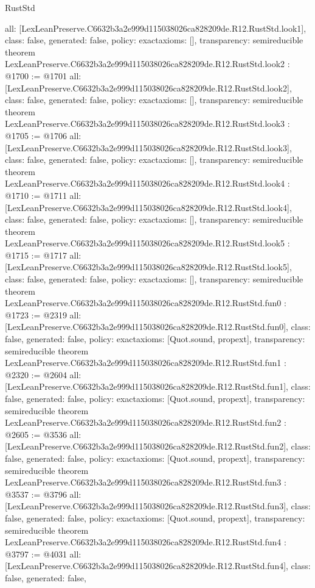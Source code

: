 \begin{lexlean}{RustStd}
\begin{coremodule}
{  all: [LexLeanPreserve.C6632b3a2e999d115038026ca828209de.R12.RustStd.look1],
  class: false,
  generated: false,
  policy: exact{axioms: []},
  transparency: semireducible
}
theorem LexLeanPreserve.C6632b3a2e999d115038026ca828209de.R12.RustStd.look2 : @1700 := @1701 {
  all: [LexLeanPreserve.C6632b3a2e999d115038026ca828209de.R12.RustStd.look2],
  class: false,
  generated: false,
  policy: exact{axioms: []},
  transparency: semireducible
}
theorem LexLeanPreserve.C6632b3a2e999d115038026ca828209de.R12.RustStd.look3 : @1705 := @1706 {
  all: [LexLeanPreserve.C6632b3a2e999d115038026ca828209de.R12.RustStd.look3],
  class: false,
  generated: false,
  policy: exact{axioms: []},
  transparency: semireducible
}
theorem LexLeanPreserve.C6632b3a2e999d115038026ca828209de.R12.RustStd.look4 : @1710 := @1711 {
  all: [LexLeanPreserve.C6632b3a2e999d115038026ca828209de.R12.RustStd.look4],
  class: false,
  generated: false,
  policy: exact{axioms: []},
  transparency: semireducible
}
theorem LexLeanPreserve.C6632b3a2e999d115038026ca828209de.R12.RustStd.look5 : @1715 := @1717 {
  all: [LexLeanPreserve.C6632b3a2e999d115038026ca828209de.R12.RustStd.look5],
  class: false,
  generated: false,
  policy: exact{axioms: []},
  transparency: semireducible
}
theorem LexLeanPreserve.C6632b3a2e999d115038026ca828209de.R12.RustStd.fun0 : @1723 := @2319 {
  all: [LexLeanPreserve.C6632b3a2e999d115038026ca828209de.R12.RustStd.fun0],
  class: false,
  generated: false,
  policy: exact{axioms: [Quot.sound, propext]},
  transparency: semireducible
}
theorem LexLeanPreserve.C6632b3a2e999d115038026ca828209de.R12.RustStd.fun1 : @2320 := @2604 {
  all: [LexLeanPreserve.C6632b3a2e999d115038026ca828209de.R12.RustStd.fun1],
  class: false,
  generated: false,
  policy: exact{axioms: [Quot.sound, propext]},
  transparency: semireducible
}
theorem LexLeanPreserve.C6632b3a2e999d115038026ca828209de.R12.RustStd.fun2 : @2605 := @3536 {
  all: [LexLeanPreserve.C6632b3a2e999d115038026ca828209de.R12.RustStd.fun2],
  class: false,
  generated: false,
  policy: exact{axioms: [Quot.sound, propext]},
  transparency: semireducible
}
theorem LexLeanPreserve.C6632b3a2e999d115038026ca828209de.R12.RustStd.fun3 : @3537 := @3796 {
  all: [LexLeanPreserve.C6632b3a2e999d115038026ca828209de.R12.RustStd.fun3],
  class: false,
  generated: false,
  policy: exact{axioms: [Quot.sound, propext]},
  transparency: semireducible
}
theorem LexLeanPreserve.C6632b3a2e999d115038026ca828209de.R12.RustStd.fun4 : @3797 := @4031 {
  all: [LexLeanPreserve.C6632b3a2e999d115038026ca828209de.R12.RustStd.fun4],
  class: false,
  generated: false,
}
\end{coremodule}
\end{lexlean}
